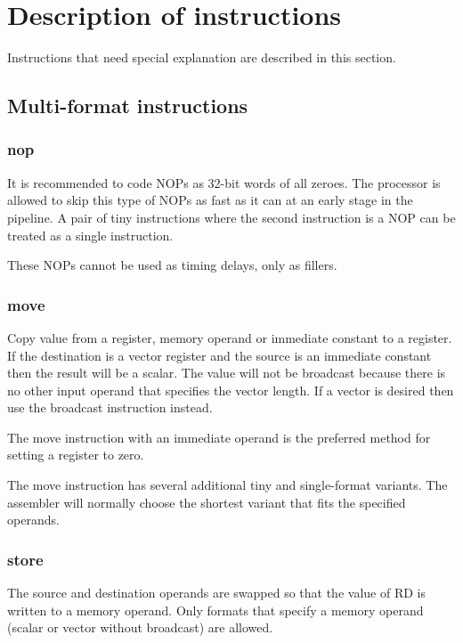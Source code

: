 \documentclass[forwardcom.tex]{subfiles}
\begin{document}
\RaggedRight


\section{Description of instructions}
Instructions that need special explanation are described in this section.

\subsection{Multi-format instructions}
\subsubsection{nop}
It is recommended to code NOPs as 32-bit words of all zeroes. The processor is allowed to skip this type of NOPs as fast as it can at an early stage in the pipeline. A pair of tiny instructions where the second instruction is a NOP can be treated as a single instruction.
\vspace{2mm}

These NOPs cannot be used as timing delays, only as fillers.

\subsubsection{move}
Copy value from a register, memory operand or immediate constant to a register. If the destination is a vector register and the source is an immediate constant then the result will be a scalar. The value will not be broadcast because there is no other input operand that specifies the vector length. If a vector is desired then use the broadcast instruction instead.
\vspace{2mm}

The move instruction with an immediate operand is the preferred method for setting a register to zero.
\vspace{2mm}

The move instruction has several additional tiny and single-format variants. The assembler will normally choose the shortest variant that fits the specified operands.


\subsubsection{store}
The source and destination operands are swapped so that the value of RD is written to a memory operand. Only formats that specify a memory operand (scalar or vector without broadcast) are allowed.
\vspace{2mm}
\end{document}
